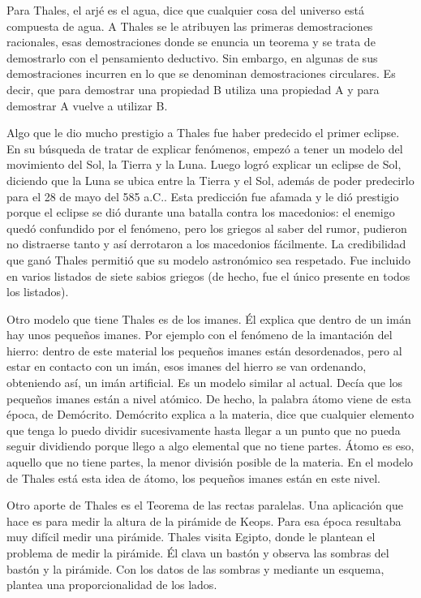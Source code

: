 Para Thales, el arjé es el agua, dice que cualquier cosa del universo está compuesta de agua. A Thales se le atribuyen las primeras demostraciones racionales, esas demostraciones donde se enuncia un teorema y se trata de demostrarlo con el pensamiento deductivo. Sin embargo, en algunas de sus demostraciones incurren en lo que se denominan demostraciones circulares. Es decir, que para demostrar una propiedad B utiliza una propiedad A y para demostrar A vuelve a utilizar B.

Algo que le dio mucho prestigio a Thales fue haber predecido el primer eclipse. En su búsqueda de tratar de explicar fenómenos, empezó a tener un modelo del movimiento del Sol, la Tierra y la Luna. Luego logró explicar un eclipse de Sol, diciendo que la Luna se ubica entre la Tierra y el Sol, además de poder predecirlo para el 28 de mayo del 585 a.C.. Esta predicción fue afamada y le dió prestigio porque el eclipse se dió durante una batalla contra los macedonios: el enemigo quedó confundido por el fenómeno, pero los griegos al saber del rumor, pudieron no distraerse tanto y así derrotaron a los macedonios fácilmente. La credibilidad que ganó Thales permitió que su modelo astronómico sea respetado. Fue incluido en varios listados de siete sabios griegos (de hecho, fue el único presente en todos los listados).

Otro modelo que tiene Thales es de los imanes. Él explica que dentro de un imán hay unos pequeños imanes. Por ejemplo con el fenómeno de la imantación del hierro: dentro de este material los pequeños imanes están desordenados, pero al estar en contacto con un imán, esos imanes del hierro se van ordenando, obteniendo así, un imán artificial. Es un modelo similar al actual. Decía que los pequeños imanes están a nivel atómico. De hecho, la palabra átomo viene de esta época, de Demócrito. Demócrito explica a la materia, dice que cualquier elemento que tenga lo puedo dividir sucesivamente hasta llegar a un punto que no pueda seguir dividiendo porque llego a algo elemental que no tiene partes. Átomo es eso, aquello que no tiene partes, la menor división posible de la materia. En el modelo de Thales está esta idea de átomo, los pequeños imanes están en este nivel.

Otro aporte de Thales es el Teorema de las rectas paralelas. Una aplicación que hace es para medir la altura de la pirámide de Keops. Para esa época resultaba muy difícil medir una pirámide. Thales visita Egipto, donde le plantean el problema de medir la pirámide. Él clava un bastón y observa las sombras del bastón y la pirámide. Con los datos de las sombras y mediante un esquema, plantea una proporcionalidad de los lados.